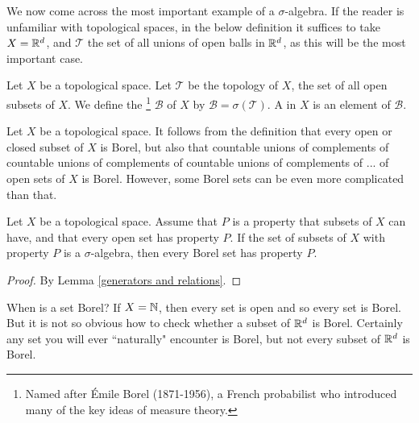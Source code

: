 \begin{subsec}
We now come across the most important example of a $\sigma$-algebra.
If the reader is unfamiliar with topological spaces, in the below definition it suffices to take $X = \mathbb{R}^d$, and $\mathcal T$ the set of all unions of open balls in $\mathbb{R}^d$, as this will be the most important case.
\end{subsec}

\begin{definition}
Let $X$ be a topological space.
Let $\mathcal T$ be the topology of $X$, the set of all open subsets of $X$.
We define the \footnote{Named after Émile Borel (1871-1956), a French probabilist who introduced many of the key ideas of measure theory.}
$\mathcal B$ of $X$ by $\mathcal B = \sigma(\mathcal T)$.
A  in $X$ is an element of $\mathcal B$.
\end{definition}

\begin{subsec}
Let $X$ be a topological space.
It follows from the definition that every open or closed subset of $X$ is Borel, but also that countable unions of complements of countable unions of complements of countable unions of complements of ... of open sets of $X$ is Borel.
However, some Borel sets can be even more complicated than that.
\end{subsec}

\begin{lemma}
Let $X$ be a topological space.
Assume that $P$ is a property that subsets of $X$ can have, and that every open set has property $P$.
If the set of subsets of $X$ with property $P$ is a $\sigma$-algebra, then every Borel set has property $P$.
\end{lemma}
\begin{proof}
By Lemma \ref{generators and relations}.
\end{proof}

\begin{subsec}
When is a set Borel? If $X = \mathbb{N}$, then every set is open and so every set is Borel.
But it is not so obvious how to check whether a subset of $\mathbb{R}^d$ is Borel.
Certainly any set you will ever ``naturally" encounter is Borel, but not every subset of $\mathbb{R}^d$ is Borel.
\end{subsec}

